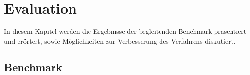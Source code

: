 \chapter{Evaluation}\label{chap:conclusion}
In diesem Kapitel werden die Ergebnisse der begleitenden Benchmark präsentiert und erörtert, sowie Möglichkeiten zur Verbesserung des Verfahrens diskutiert.

\section{Benchmark}


